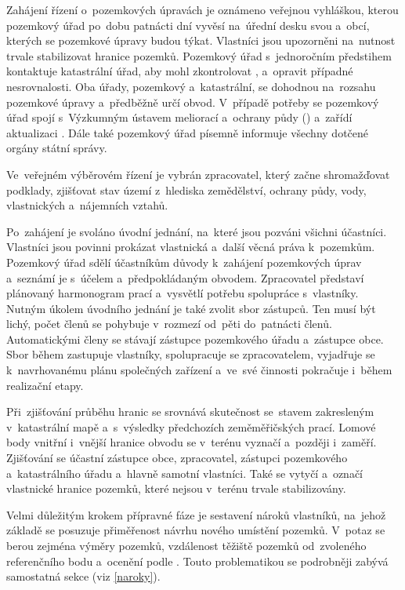 Zahájení řízení o~pozemkových úpravách je oznámeno veřejnou vyhláškou,
kterou pozemkový úřad po~dobu patnácti dní vyvěsí na~úřední desku svou
a~obcí, kterých se pozemkové úpravy budou týkat. Vlastníci jsou
upozorněni na~nutnost trvale stabilizovat hranice pozemků. Pozemkový
úřad s~jednoročním předstihem kontaktuje katastrální úřad, aby mohl
zkontrolovat ,  a~opravit případné nesrovnalosti. Oba
úřady, pozemkový a~katastrální, se dohodnou na~rozsahu pozemkové
úpravy a~předběžně určí obvod. V~případě potřeby se pozemkový úřad
spojí s~Výzkumným ústavem meliorací a~ochrany půdy ()
a~zařídí aktualizaci . Dále také pozemkový úřad písemně
informuje všechny dotčené orgány státní správy.

Ve~veřejném výběrovém řízení je vybrán zpracovatel, který začne
shromažďovat podklady, zjišťovat stav území z~hlediska zemědělství,
ochrany půdy, vody, vlastnických a~nájemních vztahů.

Po~zahájení  je svoláno úvodní jednání, na~které jsou pozváni
všichni účastníci. Vlastníci jsou povinni prokázat vlastnická a~další
věcná práva k~pozemkům. Pozemkový úřad sdělí účastníkům důvody
k~zahájení pozemkových úprav a~seznámí je s~účelem a~předpokládaným
obvodem. Zpracovatel představí plánovaný harmonogram prací a~vysvětlí
potřebu spolupráce s~vlastníky. Nutným úkolem úvodního jednání je také
zvolit sbor zástupců. Ten musí být lichý, počet členů se pohybuje
v~rozmezí od~pěti do~patnácti členů. Automatickými členy se stávají
zástupce pozemkového úřadu a~zástupce obce. Sbor během 
zastupuje vlastníky, spolupracuje se zpracovatelem, vyjadřuje se
k~navrhovanému plánu společných zařízení a~ve~své činnosti pokračuje
i~během realizační etapy.

Při~zjišťování průběhu hranic se srovnává skutečnost se~stavem
zakresleným v~katastrální mapě a~s~výsledky předchozích zeměměřičských
prací. Lomové body vnitřní i~vnější hranice obvodu se v~terénu vyznačí
a~později i~zaměří. Zjišťování se účastní zástupce obce, zpracovatel,
zástupci pozemkového a~katastrálního úřadu a~hlavně samotní
vlastníci. Také se vytyčí a~označí vlastnické hranice pozemků, které
nejsou v~terénu trvale stabilizovány.

Velmi důležitým krokem přípravné fáze je sestavení nároků vlastníků,
na~jehož základě se posuzuje přiměřenost návrhu nového umístění
pozemků. V~potaz se berou zejména výměry pozemků, vzdálenost těžiště
pozemků od~zvoleného referenčního bodu a~ocenění podle
. Touto problematikou se podrobněji zabývá samostatná sekce
(viz \ref{naroky}).

